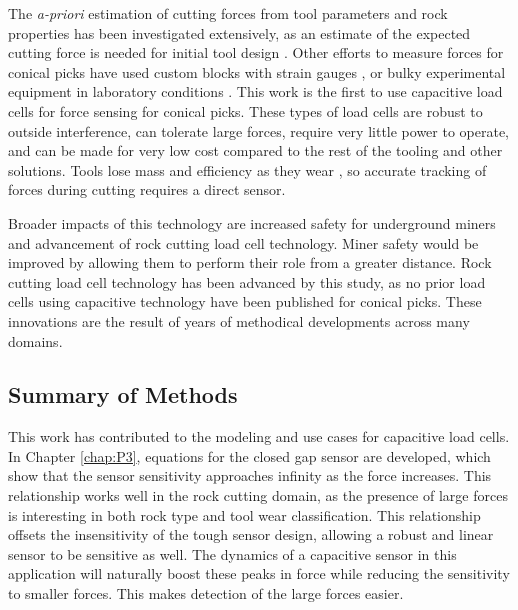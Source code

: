 The \textit{a-priori} estimation of cutting forces from tool parameters and rock properties has been 
investigated extensively, as an estimate of the expected cutting force is needed for initial tool design \cite{Li2018ATM, Morshedlou2023}.
Other efforts to measure forces for conical picks have used custom blocks with strain gauges \cite{s23239521}, 
or bulky experimental equipment in laboratory conditions \cite{WANG2018210}.
This work is the first to use capacitive load cells for force sensing for conical picks. 
These types of load cells are robust to outside interference, can tolerate large forces,
require very little power to operate, and can be made for very low cost compared to the rest of the tooling and other solutions.
Tools lose mass and efficiency as they wear \cite{Pawlik2022-cj}, so accurate tracking of forces during cutting requires a direct sensor.

Broader impacts of this technology are increased safety for underground miners 
and advancement of rock cutting load cell technology.
Miner safety would be improved by allowing them to perform their role from a greater distance.
Rock cutting load cell technology has been advanced by this study, 
as no prior load cells using capacitive technology have been published for conical picks.
These innovations are the result of years of methodical developments across many domains.

\subsection{Summary of Methods}

This work has contributed to the modeling and use cases for capacitive load cells. 
In Chapter \ref{chap:P3}, equations for the
closed gap sensor are developed, which show that the sensor sensitivity approaches infinity as the force increases.
This relationship works well in the rock cutting domain, as the presence of large forces is interesting
in both rock type and tool wear classification. 
This relationship offsets the insensitivity of the tough sensor design, 
allowing a robust and linear sensor to be sensitive as well.
The dynamics of a capacitive sensor in this application will 
naturally boost these peaks in force while reducing the sensitivity to smaller forces. This makes
detection of the large forces easier.

